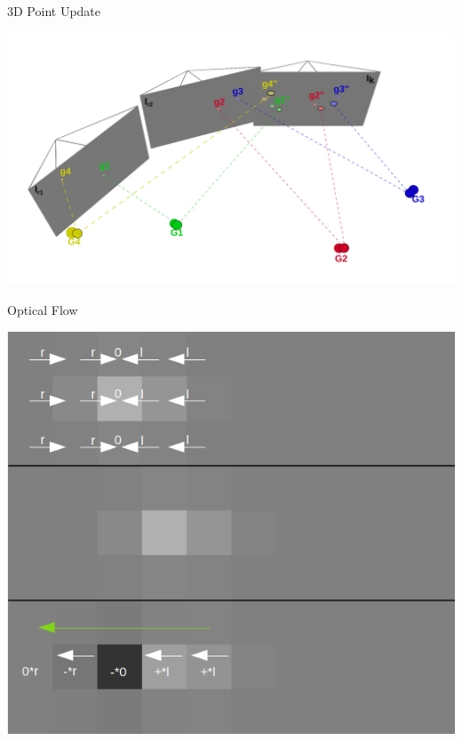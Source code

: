 \documentclass[aspectratio=169]{beamer}
\begin{document}
\begin{frame}{3D Point Update}
  \begin{center}
    \includegraphics[height=0.9\textheight]{../img/pose_estimation_point_update.png}
  \end{center}
\end{frame}

\begin{frame}{Optical Flow}
  \begin{center}
    \includegraphics[height=0.9\textheight]{../img/optical_flow_intuitive_1.png}
  \end{center}
\end{frame}
\end{document}
